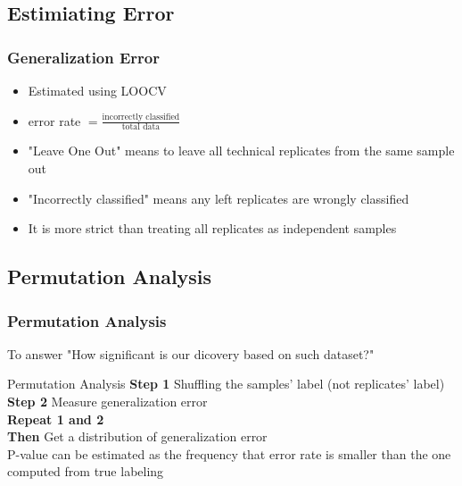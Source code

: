 \documentclass{beamer}
\begin{document}
\subsection{Estimiating Error}
\begin{frame}
\frametitle{Generalization Error}
\begin{itemize}
\item Estimated using LOOCV
\item error rate $= \frac{\text{incorrectly classified}}{\text{total data}}$
\item "Leave One Out" means to leave all technical replicates from the same sample out
\item "Incorrectly classified" means any left replicates are wrongly classified
\item It is more strict than treating all replicates as independent samples
\end{itemize}
\end{frame}

\subsection{Permutation Analysis}

\begin{frame}[fragile] %
\frametitle{Permutation Analysis}
To answer "How significant is our dicovery based on such dataset?"
\begin{exampleblock}{Permutation Analysis}
\textbf{Step 1} Shuffling the samples' label (not replicates' label)\\
\textbf{Step 2} Measure generalization error\\
\textbf{Repeat 1 and 2}\\
\textbf{Then} Get a distribution of generalization error\\
P-value can be estimated as the frequency that error rate is smaller than the one computed from true labeling
\end{exampleblock}
\end{frame}

\end{document}
